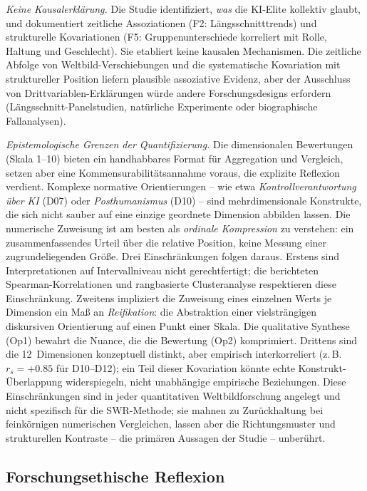 \documentclass[12pt,a4paper]{article}
\begin{document}
\emph{Keine Kausalerkl\"arung.} Die Studie identifiziert, \emph{was} die KI-Elite kollektiv glaubt, und dokumentiert zeitliche Assoziationen (F2: L\"angsschnitttrends) und strukturelle Kovariationen (F5: Gruppenunterschiede korreliert mit Rolle, Haltung und Geschlecht). Sie etabliert keine kausalen Mechanismen. Die zeitliche Abfolge von Weltbild-Verschiebungen und die systematische Kovariation mit struktureller Position liefern plausible assoziative Evidenz, aber der Ausschluss von Drittvariablen-Erkl\"arungen w\"urde andere Forschungsdesigns erfordern (L\"angsschnitt-Panelstudien, nat\"urliche Experimente oder biographische Fallanalysen).

\emph{Epistemologische Grenzen der Quantifizierung.} Die dimensionalen Bewertungen (Skala 1--10) bieten ein handhabbares Format f\"ur Aggregation und Vergleich, setzen aber eine Kommensurabilit\"atsannahme voraus, die explizite Reflexion verdient. Komplexe normative Orientierungen -- wie etwa \emph{Kontrollverantwortung \"uber KI} (D07) oder \emph{Posthumanismus} (D10) -- sind mehrdimensionale Konstrukte, die sich nicht sauber auf eine einzige geordnete Dimension abbilden lassen. Die numerische Zuweisung ist am besten als \emph{ordinale Kompression} zu verstehen: ein zusammenfassendes Urteil \"uber die relative Position, keine Messung einer zugrundeliegenden Gr\"o\ss{}e. Drei Einschr\"ankungen folgen daraus. Erstens sind Interpretationen auf Intervallniveau nicht gerechtfertigt; die berichteten Spearman-Korrelationen und rangbasierte Clusteranalyse respektieren diese Einschr\"ankung. Zweitens impliziert die Zuweisung eines einzelnen Werts je Dimension ein Ma\ss{} an \emph{Reifikation}: die Abstraktion einer vielstr\"angigen diskursiven Orientierung auf einen Punkt einer Skala. Die qualitative Synthese (Op1) bewahrt die Nuance, die die Bewertung (Op2) komprimiert. Drittens sind die 12~Dimensionen konzeptuell distinkt, aber empirisch interkorreliert (z.\,B.\ $r_s = +0.85$ f\"ur D10--D12); ein Teil dieser Kovariation k\"onnte echte Konstrukt-\"Uberlappung widerspiegeln, nicht unabh\"angige empirische Beziehungen. Diese Einschr\"ankungen sind in jeder quantitativen Weltbildforschung angelegt und nicht spezifisch f\"ur die SWR-Methode; sie mahnen zu Zur\"uckhaltung bei feink\"ornigen numerischen Vergleichen, lassen aber die Richtungsmuster und strukturellen Kontraste -- die prim\"aren Aussagen der Studie -- unber\"uhrt.

\subsection{Forschungsethische Reflexion}
\end{document}
